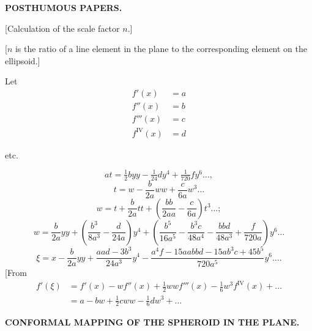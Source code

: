 \begingroup
\setlength{\abovedisplayskip}{7pt}
\setlength{\belowdisplayskip}{7pt}
\setlength{\abovedisplayshortskip}{3pt}
\setlength{\belowdisplayshortskip}{4pt}

\par\clearpage
\noindent{}\hfill{\small\textbf{POSTHUMOUS PAPERS.}}\hfill\null\par\medskip

\begin{center}
[Calculation of the scale factor \(n\).]\par\medskip
[6.]
\end{center}
[\(n\) is the ratio of a line element in the plane to the corresponding
element on the ellipsoid.]

Let
\[
\begin{aligned}
f'(x)&=a\\
f''(x)&=b\\
f'''(x)&=c\\
f^{\mathrm{IV}}(x)&=d
\end{aligned}
\]
\centerline{etc.}
\[
at=\tfrac12byy-\tfrac1{24}dy^4+\tfrac1{720}fy^6\ldots,
\]
\noindent [then]
\[
t=w-\frac b{2a}ww+\frac c{6a}w^3\ldots
\]
\noindent [or, conversely,]
\[
w=t+\frac b{2a}tt+\left(\frac{bb}{2aa}-\frac c{6a}\right)t^3\ldots;
\]
\noindent [hence]
\[
w=\frac b{2a}yy+\left(\frac{b^3}{8a^3}-\frac d{24a}\right)y^4
+\left(\frac{b^5}{16a^5}-\frac{b^3c}{48a^4}-\frac{bbd}{48a^3}+\frac f{720a}\right)y^6\ldots
\]
\noindent [and]
\[
\xi=x-\frac b{2a}yy+\frac{aad-3b^3}{24a^3}y^4
-\frac{a^4f-15aabbd-15ab^3c+45b^5}{720a^5}y^6\ldots.
\]
[From
\[
\begin{aligned}
f'(\xi)&=f'(x)-wf''(x)+\tfrac12wwf'''(x)-\tfrac16w^3f^{\mathrm{IV}}(x)+\ldots\\
&=a-bw+\tfrac12cww-\tfrac16dw^3+\ldots
\end{aligned}
\]

\par\clearpage
\noindent\null\hfill{\small\textbf{CONFORMAL MAPPING OF THE SPHEROID IN THE PLANE.}}\hfill{}\par\medskip

